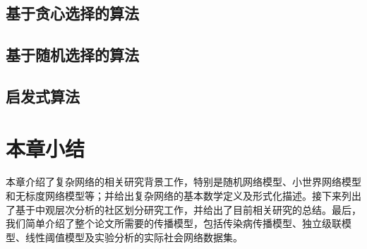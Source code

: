 \subsection{基于贪心选择的算法}
\subsection{基于随机选择的算法}
\subsection{启发式算法}


\section{本章小结}
本章介绍了复杂网络的相关研究背景工作，特别是随机网络模型、小世界网络模型和无标度网络模型等；并给出复杂网络的基本数学定义及形式化描述。接下来列出了基于中观层次分析的社区划分研究工作，并给出了目前相关研究的总结。最后，我们简单介绍了整个论文所需要的传播模型，包括传染病传播模型、独立级联模型、线性阈值模型及实验分析的实际社会网络数据集。